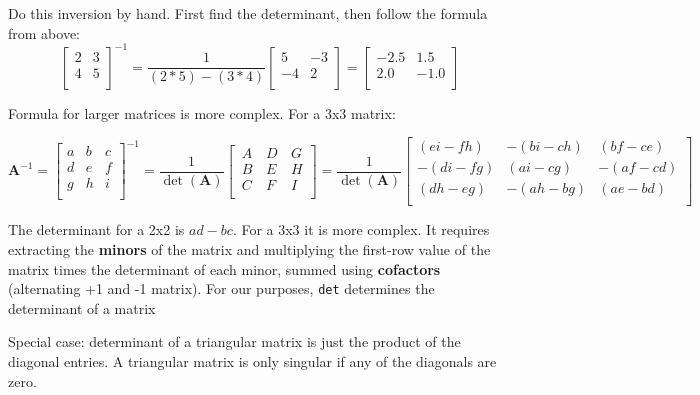 \documentclass[a4paper,12pt]{article}
\begin{document}
Do this inversion by hand. First find the determinant, then follow the formula from above:
\begin{equation*}
\begin{bmatrix}
 2 & 3 \\
 4 & 5 \\
\end{bmatrix}^{-1} = 
\dfrac{1}{(2*5)-(3*4)}
\begin{bmatrix}
 5 & -3 \\
 -4 & 2 \\
\end{bmatrix} = 
\begin{bmatrix}
 -2.5 & 1.5 \\
 2.0 & -1.0 \\
\end{bmatrix}
\end{equation*}



Formula for larger matrices is more complex. For a 3x3 matrix:

\begin{equation*}
\mathbf{A}^{-1} = \begin{bmatrix}
a & b & c\\ d & e & f \\ g & h & i\\
\end{bmatrix}^{-1} =
\frac{1}{\det(\mathbf{A})} \begin{bmatrix}
\, A & \, D & \,G \\ \, B & \, E & \,H \\ \, C & \,F & \, I\\
\end{bmatrix} = 
\frac{1}{\det(\mathbf{A})} \begin{bmatrix}
(ei-fh) & -(bi-ch) & (bf-ce) \\
-(di-fg) & (ai-cg) & -(af-cd) \\
(dh-eg) & -(ah-bg) & (ae-bd)  \\
\end{bmatrix}
\end{equation*}

The determinant for a 2x2 is $ad-bc$. For a 3x3 it is more complex. It requires extracting the \textbf{minors} of the matrix and multiplying the first-row value of the matrix times the determinant of each minor, summed using \textbf{cofactors} (alternating +1 and -1 matrix). For our purposes, \texttt{det} determines the determinant of a matrix

Special case: determinant of a triangular matrix is just the product of the diagonal entries. A triangular matrix is only singular if any of the diagonals are zero.
\end{document}
